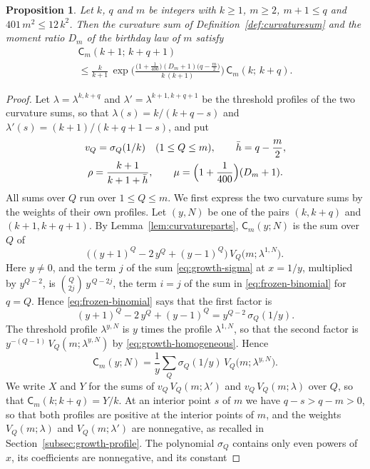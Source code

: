 \documentclass{amsart}
\newtheorem{proposition}[theorem]{Proposition}
\theoremstyle{definition}
\theoremstyle{remark}
\numberwithin{equation}{section}
\begin{document}
\begin{proposition}\label{prop:curvaturegrowth}
Let $k$, $q$ and $m$ be integers with $k\ge1$, $m\ge2$, $m+1\le q$ and
$401\,m^2\le12\,k^2$. Then the curvature sum of
Definition~\ref{def:curvaturesum} and the moment ratio $D_m$ of the
birthday law of $m$ satisfy
\begin{multline*}
\mathsf C_m(k+1;\,k+q+1)\\
\le\frac{k}{k+1}\,
\exp\biggl(\frac{\bigl(1+\frac1{400}\bigr)(D_m+1)\bigl(q-\frac m2\bigr)}
{k\,(k+1)}\biggr)\,\mathsf C_m(k;\,k+q).
\end{multline*}
\end{proposition}

\begin{proof}
Let $\lambda=\lambda^{k,k+q}$ and $\lambda'=\lambda^{k+1,k+q+1}$ be the
threshold profiles of the two curvature sums, so that
$\lambda(s)=k/(k+q-s)$ and $\lambda'(s)=(k+1)/(k+q+1-s)$, and put
\begin{gather*}
v_Q=\sigma_Q(1/k)\quad(1\le Q\le m),\qquad\bar h=q-\frac m2,\\
\rho=\frac{k+1}{k+1+\bar h},\qquad
\mu=\Bigl(1+\frac1{400}\Bigr)(D_m+1).
\end{gather*}
All sums over $Q$ run over $1\le Q\le m$. We first express the two curvature
sums by the weights of their own profiles. Let $(y,N)$ be one of the pairs
$(k,k+q)$ and $(k+1,k+q+1)$. By Lemma~\ref{lem:curvatureparts},
$\mathsf C_m(y;N)$ is the sum over $Q$ of
\[
\bigl((y+1)^Q-2\,y^Q+(y-1)^Q\bigr)\,V_Q\bigl(m;\lambda^{1,N}\bigr).
\]
Here $y\ne0$, and the term $j$ of the sum \eqref{eq:growth-sigma} at
$x=1/y$, multiplied by $y^{Q-2}$, is $\binom{Q}{2j}\,y^{\,Q-2j}$, the term
$i=j$ of the sum in \eqref{eq:frozen-binomial} for $q=Q$. Hence
\eqref{eq:frozen-binomial} says that the first factor is
\[
(y+1)^Q-2\,y^Q+(y-1)^Q=y^{Q-2}\,\sigma_Q(1/y).
\]
The threshold profile $\lambda^{y,N}$
is $y$ times the profile $\lambda^{1,N}$, so that the second factor is
$y^{-(Q-1)}\,V_Q(m;\lambda^{y,N})$ by \eqref{eq:growth-homogeneous}. Hence
\[
\mathsf C_m(y;N)=\frac1y\sum_{Q}\sigma_Q(1/y)\,V_Q\bigl(m;\lambda^{y,N}\bigr).
\]
We write $X$ and $Y$ for the sums of $v_Q\,V_Q(m;\lambda')$ and
$v_Q\,V_Q(m;\lambda)$ over $Q$, so that $\mathsf C_m(k;k+q)=Y/k$. At an
interior point $s$ of $m$ we have $q-s>q-m>0$, so that both profiles are
positive at the interior points of $m$, and the weights $V_Q(m;\lambda)$
and $V_Q(m;\lambda')$ are nonnegative, as recalled in
Section~\ref{subsec:growth-profile}. The polynomial $\sigma_Q$ contains only
even powers of $x$, its coefficients are nonnegative, and its constant

\end{proof}
\end{document}
